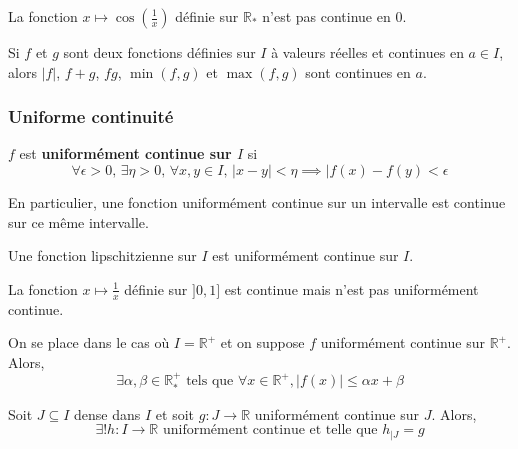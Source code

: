   \begin{example}
    La fonction $x \mapsto \cos \left( \frac{1}{x} \right)$ définie sur $\mathbb{R}_*$ n'est pas continue en $0$.
  \end{example}

  \begin{proposition}
    Si $f$ et $g$ sont deux fonctions définies sur $I$ à valeurs réelles et continues en $a \in I$, alors $\vert f \vert$, $f + g$, $fg$, $\min(f,g)$ et $\max(f,g)$ sont continues en $a$.
  \end{proposition}

  \subsubsection{Uniforme continuité}


  \begin{definition}
    $f$ est \textbf{uniformément continue sur $I$} si
    \[ \forall \epsilon > 0, \, \exists \eta > 0, \, \forall x, y \in I, \, \vert x - y \vert < \eta \implies \vert f(x) - f(y) < \epsilon \]
  \end{definition}

  \begin{remark}
    En particulier, une fonction uniformément continue sur un intervalle est continue sur ce même intervalle.
  \end{remark}

  \begin{example}
    Une fonction lipschitzienne sur $I$ est uniformément continue sur $I$.
  \end{example}

  \begin{cexample}
    La fonction $x \mapsto \frac{1}{x}$ définie sur $]0,1]$ est continue mais n'est pas uniformément continue.
  \end{cexample}


  \begin{proposition}
    On se place dans le cas où $I = \mathbb{R}^+$ et on suppose $f$ uniformément continue sur $\mathbb{R}^+$. Alors,
    \[ \exists \alpha, \beta \in \mathbb{R}^+_* \text{ tels que } \forall x \in \mathbb{R}^+, \vert f(x) \vert \leq \alpha x + \beta \]
  \end{proposition}


  \begin{theorem}
    Soit $J \subseteq I$ dense dans $I$ et soit $g : J \rightarrow \mathbb{R}$ uniformément continue sur $J$. Alors,
    \[ \exists! h : I \rightarrow \mathbb{R} \text{ uniformément continue et telle que } h_{|J} = g \]
  \end{theorem}

